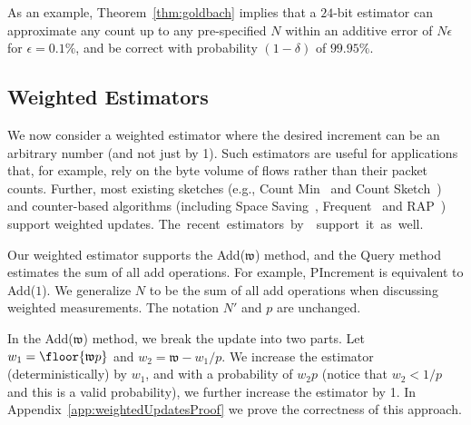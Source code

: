 As an example, Theorem~\ref{thm:goldbach} implies that a $24$-bit estimator can approximate any count up to any pre-specified $N$ within an additive error of $N\epsilon$ for $\epsilon=0.1\%$, and be correct with probability $(1-\delta)$ of $99.95\%$.




\subsection{Weighted Estimators}\label{sec:weighted}
We now consider a weighted estimator where the desired increment can be an arbitrary number (and not just by 1). Such estimators are useful for applications that, for example, rely on the byte volume of flows rather than their packet counts. Further, most existing sketches (e.g., Count Min~\cite{CountMinSketch} and Count Sketch~\cite{CountSketch}) and counter-based algorithms (including Space Saving~\cite{SpaceSavings}, Frequent~\cite{BatchDecrement,frequent4} and RAP~\cite{RAP}) support weighted updates.
\mbox{The recent estimators by~\cite{Infocom2019} support it as well.}

Our weighted estimator supports the {\sc Add}($\mathfrak w$) method, and the {\sc Query} method estimates the sum of all add operations. For example, {\sc PIncrement} is equivalent to {\sc Add}($1$). We generalize $N$ to be the sum of all add operations when discussing weighted measurements.  The notation $N'$ and $p$ are unchanged. 

 
In the {\sc Add}($\mathfrak w$) method, we break the update into two parts.  Let $w_1 = \floor{\mathfrak w p}$ and $w_2 = \mathfrak w - w_1/p$. We
increase the estimator (deterministically) by $w_1$, and with a probability of $w_2 p$ (notice that $w_2<1/p$ and this is a valid probability), we further increase the estimator by 1. 
In Appendix~\ref{app:weightedUpdatesProof} we prove the correctness of this approach. 

